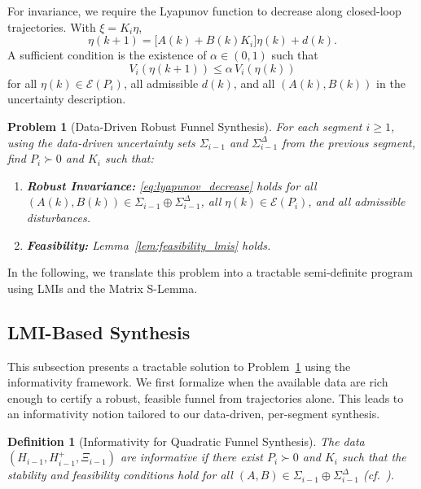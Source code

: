 \documentclass[letterpaper, 10 pt, conference]{ieeeconf}
\newtheorem{definition}{Definition}
\newtheorem{problem}{Problem}
\begin{document}
For invariance, we require the Lyapunov function to decrease along closed-loop trajectories. With $\xi = K_i \eta$,
\[
\eta(k{+}1) = \big[A(k) + B(k) K_i\big] \eta(k) + d(k).
\]
A sufficient condition is the existence of $\alpha \in (0,1)$ such that
\begin{equation}\label{eq:lyapunov_decrease}
V_i(\eta(k{+}1)) \le \alpha\, V_i(\eta(k))
\end{equation}
for all $\eta(k) \in \mathcal{E}(P_i)$, all admissible $d(k)$, and all $(A(k),B(k))$ in the uncertainty description.

\begin{problem}[Data-Driven Robust Funnel Synthesis]\label{prob:funnel_synthesis}
For each segment $i \ge 1$, using the data-driven uncertainty sets $\Sigma_{i-1}$ and $\Sigma_{i-1}^\Delta$ from the previous segment, find $P_i \succ 0$ and $K_i$ such that:
\begin{enumerate}
    \item[(a)] \textbf{Robust Invariance:} \eqref{eq:lyapunov_decrease} holds for all $(A(k),B(k)) \in \Sigma_{i-1} \oplus \Sigma_{i-1}^\Delta$, all $\eta(k)\in\mathcal{E}(P_i)$, and all admissible disturbances.
    \item[(b)] \textbf{Feasibility:} Lemma~\ref{lem:feasibility_lmis}  holds.
\end{enumerate}
\end{problem}

In the following, we translate this problem into a tractable semi-definite program using LMIs and the Matrix S-Lemma.

\subsection{LMI-Based Synthesis}
\label{subsec:lmi_synthesis}

This subsection presents a tractable solution to Problem~\ref{prob:funnel_synthesis} using the informativity framework.
We first formalize when the available data are rich enough to certify a robust, feasible funnel from trajectories alone. This leads to an informativity notion tailored to our data-driven, per-segment synthesis.
\begin{definition}[Informativity for Quadratic Funnel Synthesis]
The data $(H_{i-1}, H^+_{i-1}, \Xi_{i-1})$ are informative if there exist $P_i \succ 0$ and $K_i$ such that the stability and feasibility conditions hold for all $(A,B) \in \Sigma_{i-1} \oplus \Sigma_{i-1}^\Delta$ (cf.\ \cite{vanWaarde2020TAC}).
\end{definition}
\end{document}
